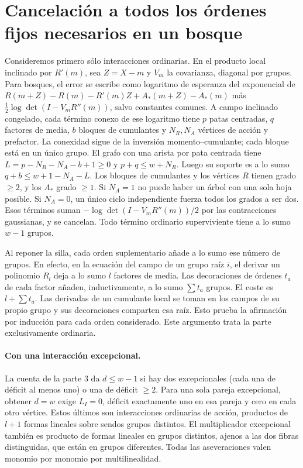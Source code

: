 \section{Cancelación a todos los órdenes fijos necesarios en un bosque}
Consideremos primero sólo interacciones ordinarias. En el producto local inclinado
por $R'(m)$, sea $Z=X-m$ y $V_m$ la covarianza, diagonal por grupos. Para bosques,
el error se escribe como logaritmo de esperanza del exponencial de
$R(m+Z)-R(m)-R'(m)Z+A_*(m+Z)-A_*(m)$ más
$\tfrac12\log\det(I-V_mR''(m))$, salvo constantes comunes.
A campo inclinado congelado, cada término conexo de ese logaritmo tiene $p$ patas
centradas, $q$ factores de media, $b$ bloques de cumulantes y $N_R,N_A$ vértices de
acción y prefactor. La conexidad sigue de la inversión momento--cumulante; cada bloque
está en un único grupo. El grafo con una arista por pata centrada tiene
$L=p-N_R-N_A-b+1\ge0$ y $p+q\le w+N_R$. Luego su soporte es a lo sumo
$q+b\le w+1-N_A-L$. Los bloques de cumulantes y los vértices $R$ tienen grado
$\ge2$, y los $A_*$ grado $\ge1$. Si $N_A=1$ no puede haber un árbol con una sola
hoja posible. Si $N_A=0$, un único ciclo independiente fuerza todos los grados
a ser dos. Esos términos suman $-\log\det(I-V_mR''(m))/2$ por las contracciones gaussianas,
y se cancelan. Todo término ordinario superviviente tiene a lo sumo $w-1$ grupos.

Al reponer la silla, cada orden suplementario añade a lo sumo ese número de grupos.
En efecto, en la ecuación del campo de un grupo raíz $i$, el derivar un polinomio
$R_l$ deja a lo sumo $l$ factores de media. Las decoraciones de órdenes $t_a$ de cada
factor añaden, inductivamente, a lo sumo $\sum t_a$ grupos. El coste es $l+\sum t_a$.
Las derivadas de un cumulante local se toman en los campos de su propio grupo y sus
decoraciones comparten esa raíz. Esto prueba la afirmación por inducción para cada
orden considerado. Este argumento trata la parte exclusivamente ordinaria.

\paragraph{Con una interacción excepcional.}
La cuenta de la parte 3 da $d\le w-1$ si hay dos excepcionales (cada una de déficit
al menos uno) o una de déficit $\ge2$. Para una sola pareja excepcional, obtener
$d=w$ exige $L_I=0$, déficit exactamente uno en esa pareja y cero en cada otro vértice.
Estos últimos son interacciones ordinarias de acción, productos de $l+1$ formas lineales
sobre sendos grupos distintos. El multiplicador excepcional también es producto de
formas lineales en grupos distintos, ajenos a las dos fibras distinguidas, que están
en grupos diferentes. Todas las aseveraciones valen monomio por monomio por multilinealidad.

